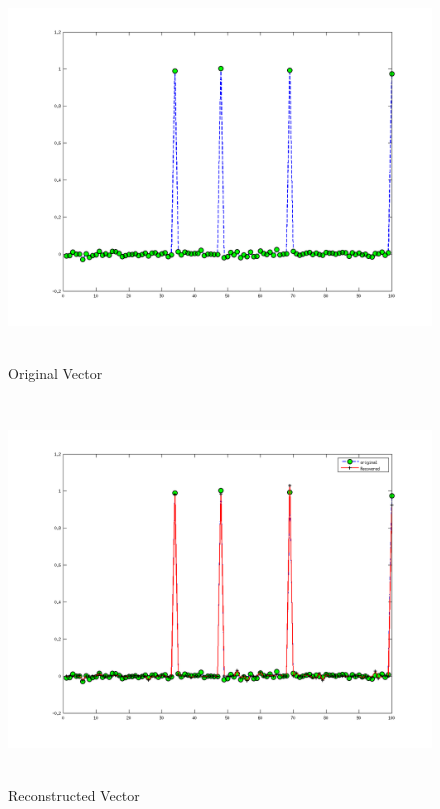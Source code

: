 \begin{figure}[!htbp]
  \begin{center}
      \includegraphics[width=6.1in,height=4in]{figures/orgvect}
    \caption{Original Vector}
    \label{Figorgvect}
  \end{center}

\end{figure}
\begin{figure}[!htbp]
  \begin{center}
      \includegraphics[width=6.1in,height=4in]{figures/recvect}
    \caption{Reconstructed Vector}
    \label{Figrecvect}
  \end{center}
\end{figure}
